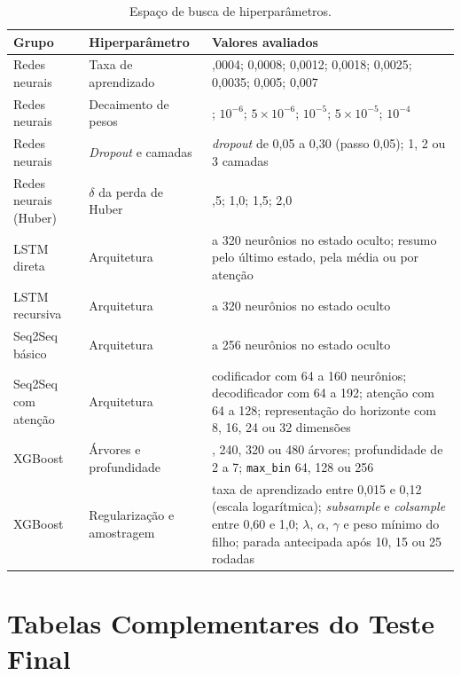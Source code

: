 \begin{table}[htbp]
    \centering
    \caption{Espaço de busca de hiperparâmetros.}
    \label{tab:hpo_espaco_busca}
    \footnotesize
    \renewcommand{\arraystretch}{1.05}
    \begin{tabular}{>{\raggedright\arraybackslash}p{}>{\raggedright\arraybackslash}p{}>{\raggedright\arraybackslash}p{}}
        \toprule
        \textbf{Grupo} & \textbf{Hiperparâmetro} & \textbf{Valores avaliados} \\
        \midrule
        Redes neurais & Taxa de aprendizado & 0,0004; 0,0008; 0,0012; 0,0018; 0,0025; 0,0035; 0,005; 0,007 \\
        Redes neurais & Decaimento de pesos & 0; \(10^{-6}\); \(5\times10^{-6}\); \(10^{-5}\); \(5\times10^{-5}\); \(10^{-4}\) \\
        Redes neurais & \textit{Dropout} e camadas & \textit{dropout} de 0,05 a 0,30 (passo 0,05); 1, 2 ou 3 camadas \\
        Redes neurais (Huber) & \(\delta\) da perda de Huber & 0,5; 1,0; 1,5; 2,0 \\
        LSTM direta & Arquitetura & 64 a 320 neurônios no estado oculto; resumo pelo último estado, pela média ou por atenção \\
        LSTM recursiva & Arquitetura & 64 a 320 neurônios no estado oculto \\
        Seq2Seq básico & Arquitetura & 64 a 256 neurônios no estado oculto \\
        Seq2Seq com atenção & Arquitetura & codificador com 64 a 160 neurônios; decodificador com 64 a 192; atenção com 64 a 128; representação do horizonte com 8, 16, 24 ou 32 dimensões \\
        XGBoost & Árvores e profundidade & 160, 240, 320 ou 480 árvores; profundidade de 2 a 7; \texttt{max\_bin} 64, 128 ou 256 \\
        XGBoost & Regularização e amostragem & taxa de aprendizado entre 0,015 e 0,12 (escala logarítmica); \textit{subsample} e \textit{colsample} entre 0,60 e 1,0; \(\lambda\), \(\alpha\), \(\gamma\) e peso mínimo do filho; parada antecipada após 10, 15 ou 25 rodadas \\
        \bottomrule
    \end{tabular}
\end{table}


\section{Tabelas Complementares do Teste Final}

